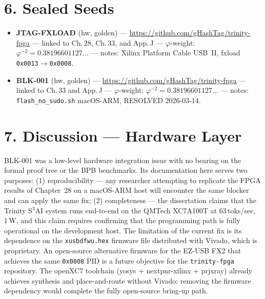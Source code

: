 \section{6. Sealed Seeds}\label{sec:epilogue-seeds}

\begin{itemize}
\item \textbf{JTAG-FXLOAD} (hw, golden) ---
  \url{https://github.com/gHashTag/trinity-fpga} --- linked to Ch.\,28,
  Ch.\,33, and App.\,J --- $\varphi$-weight:
  $\varphi^{-2}=0.38196601127\ldots$ --- notes: Xilinx Platform Cable
  USB~II, fxload \texttt{0x0013}$\to$\texttt{0x0008}.
\item \textbf{BLK-001} (hw, golden) ---
  \url{https://github.com/gHashTag/trinity-fpga} --- linked to Ch.\,33
  and App.\,J --- $\varphi$-weight: $\varphi^{-2}=0.38196601127\ldots$
  --- notes: \texttt{flash\_no\_sudo.sh} macOS-ARM, RESOLVED 2026-03-14.
\end{itemize}

\section{7. Discussion — Hardware Layer}\label{sec:epilogue-discussion-hw}

BLK-001 was a low-level hardware integration issue with no bearing on the
formal proof tree or the BPB benchmarks.  Its documentation here serves two
purposes: (1) reproducibility --- any researcher attempting to replicate
the FPGA results of Chapter~28 on a macOS-ARM host will encounter the same
blocker and can apply the same fix; (2) completeness --- the dissertation
claims that the Trinity S${}^3$AI system runs end-to-end on the QMTech
XC7A100T at 63\,toks/sec, 1\,W, and this claim requires confirming that
the programming path is fully operational on the development host.  The
limitation of the current fix is its dependence on the
\texttt{xusbdfwu.hex} firmware file distributed with Vivado, which is
proprietary.  An open-source alternative firmware for the EZ-USB FX2 that
achieves the same \texttt{0x0008} PID is a future objective for the
\texttt{trinity-fpga} repository.  The openXC7 toolchain (yosys +
nextpnr-xilinx + prjxray) already achieves synthesis and place-and-route
without Vivado; removing the firmware dependency would complete the fully
open-source bring-up path.


